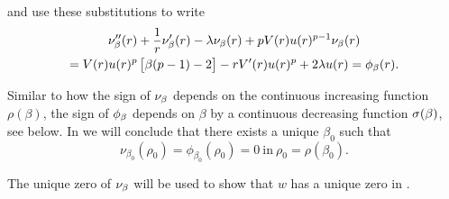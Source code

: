 and use these substitutions to write 
% 
% 
\begin{multline}
\nu_{\beta}''(r) + \frac{1}{r} \nu_{\beta}'(r) - \lambda \nu_{\beta}(r) + p V(r) u(r)^{p-1}
\nu_{\beta}(r) \\
= V(r) u(r)^p \left[ \beta (p-1) -2 \right] 
- r V'(r) u(r)^p + 2 \lambda u(r) = \phi_{\beta}(r).
\end{multline}

%
Similar to how the sign of $\nu_{\beta}$ depends on the continuous increasing function
$\rho(\beta)$, the sign of $\phi_{\beta}$ depends on $\beta$ by a continuous decreasing
function $\sigma(\beta)$, see  below. In  we will conclude
that there exists a unique $\beta_0$ such that 
\[
    \nu_{\beta_0}(\rho_0)=\phi_{\beta_0}(\rho_0) = 0 ~ 
    \text{in} ~ \rho_0=\rho(\beta_0).
\]

The unique zero of $\nu_{\beta}$ will be used to show that $w$ has a unique zero in
.
\newpage

